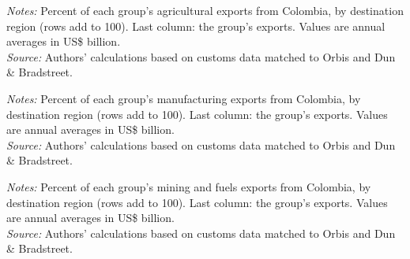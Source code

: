\documentclass[11pt,a4paper]{article}
\begin{document}
\begin{table}[H]\centering\small%
  \caption{Colombia, Agriculture: Multinational Exports by Parent Region and Destination Region}%
  \label{tab:c_reg_COL_agro}%
  \par\vspace{3pt}%
  \begin{minipage}{0.95\textwidth}\footnotesize %
  \textit{Notes:} Percent of each group's agricultural exports from Colombia, by destination region (rows add to 100). Last column: the group's exports. Values are annual averages in US\$ billion.\\[3pt]%
  \textit{Source:} Authors' calculations based on customs data matched to Orbis and Dun \& Bradstreet.%
  \end{minipage}%
  \end{table}
\begin{table}[H]\centering\small%
  \caption{Colombia, Manufacturing: Multinational Exports by Parent Region and Destination Region}%
  \label{tab:c_reg_COL_manufacturing}%
  \par\vspace{3pt}%
  \begin{minipage}{0.95\textwidth}\footnotesize %
  \textit{Notes:} Percent of each group's manufacturing exports from Colombia, by destination region (rows add to 100). Last column: the group's exports. Values are annual averages in US\$ billion.\\[3pt]%
  \textit{Source:} Authors' calculations based on customs data matched to Orbis and Dun \& Bradstreet.%
  \end{minipage}%
  \end{table}
\begin{table}[H]\centering\small%
  \caption{Colombia, Mining and Fuels: Multinational Exports by Parent Region and Destination Region}%
  \label{tab:c_reg_COL_mining}%
  \par\vspace{3pt}%
  \begin{minipage}{0.95\textwidth}\footnotesize %
  \textit{Notes:} Percent of each group's mining and fuels exports from Colombia, by destination region (rows add to 100). Last column: the group's exports. Values are annual averages in US\$ billion.\\[3pt]%
  \textit{Source:} Authors' calculations based on customs data matched to Orbis and Dun \& Bradstreet.%
  \end{minipage}%
  \end{table}
\end{document}
